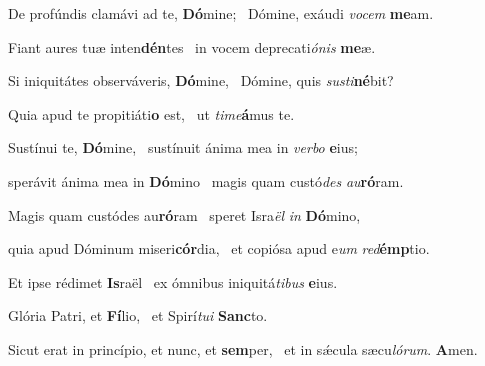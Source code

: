 \item De profúndis clamávi ad te, \textbf{Dó}mine;~\psstar{} Dómine, exáudi \textit{vocem} \textbf{me}am.

\item Fiant aures tuæ inten\textbf{dén}tes~\psstar{} in vocem deprecati\textit{ónis} \textbf{me}æ.

\item Si iniquitátes observáveris, \textbf{Dó}mine,~\psstar{} Dómine, quis \textit{susti}\textbf{né}bit?

\item Quia apud te propitiáti\textbf{o} est,~\psstar{} ut \textit{time}\textbf{á}mus te.

\item Sustínui te, \textbf{Dó}mine,~\psstar{} sustínuit ánima mea in \textit{verbo} \textbf{e}ius;

\item sperávit ánima mea in \textbf{Dó}mino~\psstar{} magis quam custó\textit{des} \textit{au}\textbf{ró}ram.

\item Magis quam custódes au\textbf{ró}ram~\psstar{} speret Isra\textit{ël} \textit{in} \textbf{Dó}mino,

\item quia apud Dóminum miseri\textbf{cór}dia,~\psstar{} et copiósa apud e\textit{um} \textit{red}\textbf{émp}tio.

\item Et ipse rédimet \textbf{Is}raël~\psstar{} ex ómnibus iniquitá\textit{tibus} \textbf{e}ius.

\item Glória Patri, et \textbf{Fí}lio,~\psstar{} et Spirí\textit{tui} \textbf{Sanc}to.

\item Sicut erat in princípio, et nunc, et \textbf{sem}per,~\psstar{} et in sǽcula sæcu\textit{lórum}. \textbf{A}men.